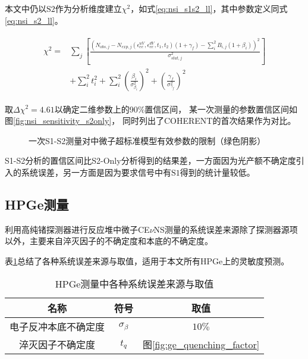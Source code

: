 本文中仍以$\mathrm{S2}$作为分析维度建立$\chi^2$，如式\ref{eq:nsi_s1s2_ll}，其中参数定义同式\ref{eq:nsi_s2_ll}。

\begin{align}
    \label{eq:nsi_s1s2_ll}
    \begin{split}
    \chi^2 =& \sum_j\left[\frac{\left(N_{obs,j} - N_{exp,j}(\epsilon^{uV}_{ee}, \epsilon^{dV}_{ee}, t_1, t_2)(1 + \gamma_f) 
    - \sum_{i}^2 B_{i,j}(1 + \beta_i)\right)^2}{\sigma^2_{stat,j}}\right] \\
    & + \sum_{i}^2 t_i^2 + \sum_{i}^2(\frac{\beta_i}{\sigma^2_{\beta_i}})^2 + (\frac{\gamma_f}{\sigma^2_{\gamma_f}})^2
    \end{split}
\end{align}

取$\Delta \chi^2=4.61$以确定二维参数上的90\%置信区间，
某一次测量的参数置信区间如图\ref{fig:nsi_sensitivity_s2only}，
同时列出了COHERENT的首次结果作为对比\cite{akimov_observation_2017}。

\begin{figure}
  \centering
  
  \caption{\label{fig:nsi_sensitivity_s1s2} 一次S1-S2测量对中微子超标准模型有效参数的限制（绿色阴影）}
\end{figure}

S1-S2分析的置信区间比S2-Only分析得到的结果差，一方面因为光产额不确定度引入的系统误差，另一方面是因为要求信号中有$\mathrm{S1}$得到的统计量较低。

\subsection{HPGe测量}

利用高纯锗探测器进行反应堆中微子CE$\nu$NS测量的系统误差来源除了探测器源项以外，主要来自淬灭因子的不确定度和本底的不确定度。

表\ref{tab:sys_error_ge}总结了各种系统误差来源与取值，适用于本文所有HPGe上的灵敏度预测。

\begin{table}
  \centering
  \caption{HPGe测量中各种系统误差来源与取值}
  \begin{tabular}{ccc}
    \toprule
    名称 & 符号 & 取值 \\
    \midrule
    电子反冲本底不确定度 & $\sigma_{\beta}$ & $10\%$ \\
    淬灭因子不确定度 & $t_q$ & 图\ref{fig:ge_quenching_factor} \\
    \bottomrule
  \end{tabular}
  \label{tab:sys_error_ge}
\end{table}


